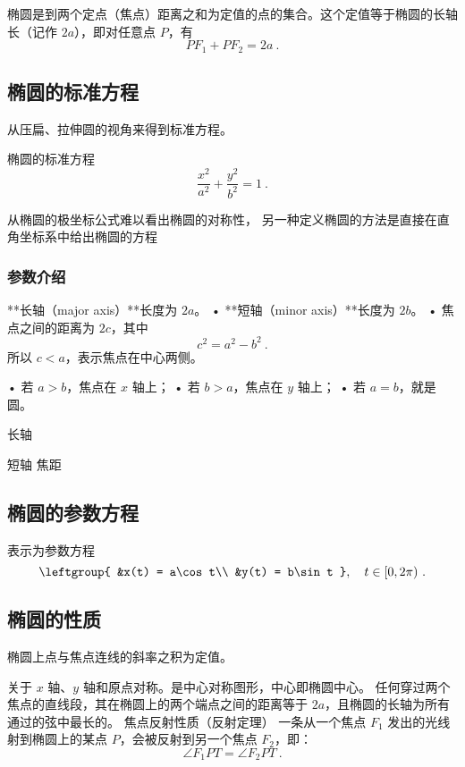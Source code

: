 椭圆是到两个定点（焦点）距离之和为定值的点的集合。这个定值等于椭圆的长轴长（记作 $2a$），即对任意点 $P$，有
\begin{equation}\label{eq_Elips3_9}
PF_1 + PF_2 = 2a ~.
\end{equation}



\subsection{椭圆的标准方程}

从压扁、拉伸圆的视角来得到标准方程。

\begin{definition}{椭圆的标准方程}
\begin{equation}\label{eq_Elips3_3}
\frac{x^2}{a^2} + \frac{y^2}{b^2} = 1~.
\end{equation}
\end{definition}

从椭圆的极坐标公式难以看出椭圆的对称性， 另一种定义椭圆的方法是直接在直角坐标系中给出椭圆的方程

\subsubsection{参数介绍}

**长轴（major axis）**长度为 $2a$。
	•	**短轴（minor axis）**长度为 $2b$。
	•	焦点之间的距离为 $2c$，其中
$$ c^2 = a^2 - b^2~. $$
所以 $c < a$，表示焦点在中心两侧。

	•	若 $a > b$，焦点在 $x$ 轴上；
	•	若 $b > a$，焦点在 $y$ 轴上；
	•	若 $a = b$，就是圆。


长轴

短轴
焦距

\subsection{椭圆的参数方程}
表示为参数方程
\begin{equation}\label{eq_Elips3_1}
\leftgroup{
&x(t) = a\cos t\\
&y(t) = b\sin t
},\quad t \in [0, 2\pi) ~.
\end{equation}
\subsection{椭圆的性质}

椭圆上点与焦点连线的斜率之积为定值。

关于 $x$ 轴、$y$ 轴和原点对称。是中心对称图形，中心即椭圆中心。
任何穿过两个焦点的直线段，其在椭圆上的两个端点之间的距离等于 $2a$，且椭圆的长轴为所有通过的弦中最长的。
焦点反射性质（反射定理）
一条从一个焦点 $F_1$ 发出的光线射到椭圆上的某点 $P$，会被反射到另一个焦点 $F_2$，即：
\begin{equation}
\angle F_1PT = \angle F_2PT~.
\end{equation}

